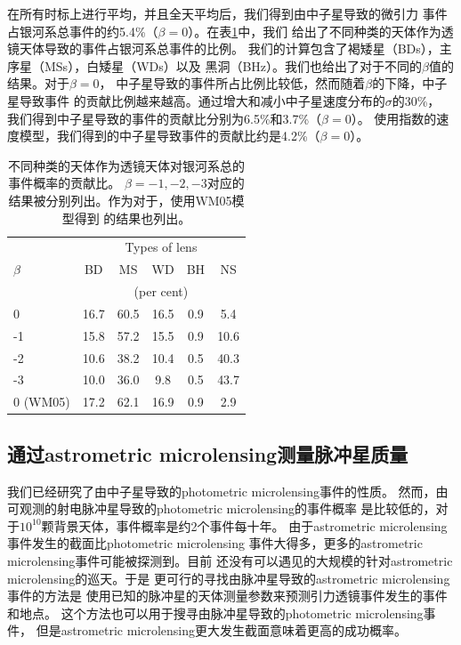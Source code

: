 在所有时标上进行平均，并且全天平均后，我们得到由中子星导致的微引力
事件占银河系总事件的约5.4\%（$\beta=0$）。在表\ref{percent}中，我们
给出了不同种类的天体作为透镜天体导致的事件占银河系总事件的比例。
我们的计算包含了褐矮星（BDs），主序星（MSs），白矮星（WDs）以及
黑洞（BHz）。我们也给出了对于不同的$\beta$值的结果。对于$\beta=0$，
中子星导致的事件所占比例比较低，然而随着$\beta$的下降，中子星导致事件
的贡献比例越来越高。通过增大和减小中子星速度分布的$\sigma$的30\%，
我们得到中子星导致的事件的贡献比分别为6.5\%和3.7\%（$\beta=0$）。
使用指数的速度模型，我们得到的中子星导致事件的贡献比约是4.2\%（$\beta=0$）。
%
\begin{table}
\begin{center}
\caption{不同种类的天体作为透镜天体对银河系总的事件概率的贡献比。
$\beta=-1,-2,-3$对应的结果被分别列出。作为对于，使用WM05模型得到
的结果也列出。}
\label{percent}
%
\begin{tabular}{lccccc}
\hline
             &       \multicolumn{5}{c}{Types of lens}      \\
$\beta$      & BD   &    MS    &    WD     &  BH   & NS     \\
             &       \multicolumn{5}{c}{(per cent)}         \\
\hline
0            & 16.7 &    60.5  &    16.5   &  0.9  & 5.4    \\
-1           & 15.8 &    57.2  &    15.5   &  0.9  & 10.6   \\        
-2           & 10.6 &    38.2  &    10.4   &  0.5  & 40.3   \\         
-3           & 10.0 &    36.0  &    9.8    &  0.5  & 43.7   \\            
0 (WM05)     & 17.2 &    62.1  &    16.9   &  0.9  & 2.9    \\
\hline
\end{tabular}
\end{center}
\end{table}
%
%

\subsection{通过astrometric microlensing测量脉冲星质量}

我们已经研究了由中子星导致的photometric microlensing事件的性质。
然而，由可观测的射电脉冲星导致的photometric microlensing的事件概率
是比较低的，对于$10^{10}$颗背景天体，事件概率是约2个事件每十年。
由于astrometric microlensing事件发生的截面比photometric microlensing
事件大得多，更多的astrometric microlensing事件可能被探测到。目前
还没有可以遇见的大规模的针对astrometric microlensing的巡天。于是
更可行的寻找由脉冲星导致的astrometric microlensing事件的方法是
使用已知的脉冲星的天体测量参数来预测引力透镜事件发生的事件和地点。
这个方法也可以用于搜寻由脉冲星导致的photometric microlensing事件，
但是astrometric microlensing更大发生截面意味着更高的成功概率。

